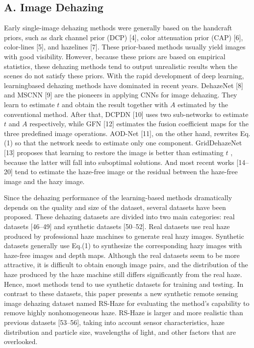 \documentclass{article}
\begin{document}
\subsection{A. Image Dehazing}


Early single-image dehazing methods were generally based on the handcraft priors, such as dark channel prior (DCP) [4], color attenuation prior (CAP) [6], color-lines [5], and hazelines [7]. These prior-based methods usually yield images with good visibility. However, because these priors are based on empirical statistics, these dehazing methods tend to output unrealistic results when the scenes do not satisfy these priors. With the rapid development of deep learning, learningbased dehazing methods have dominated in recent years. DehazeNet [8] and MSCNN [9] are the pioneers in applying CNNs for image dehazing. They learn to estimate $t$ and obtain the result together with $A$ estimated by the conventional method. After that, DCPDN [10] uses two sub-networks to estimate $t$ and $A$ respectively, while GFN [12] estimates the fusion coefficient maps for the three predefined image operations. AOD-Net [11], on the other hand, rewrites Eq.(1) so that the network needs to estimate only one component. GridDehazeNet [13] proposes that learning to restore the image is better than estimating $t$ , because the latter will fall into suboptimal solutions. And most recent works [14–20] tend to estimate the haze-free image or the residual between the haze-free image and the hazy image.


Since the dehazing performance of the learning-based methods dramatically depends on the quality and size of the dataset, several datasets have been proposed. These dehazing datasets are divided into two main categories: real datasets [46–49] and synthetic datasets [50–52]. Real datasets use real haze produced by professional haze machines to generate real hazy images. Synthetic datasets generally use Eq.(1) to synthesize the corresponding hazy images with haze-free images and depth maps. Although the real datasets seem to be more attractive, it is difficult to obtain enough image pairs, and the distribution of the haze produced by the haze machine still differs significantly from the real haze. Hence, most methods tend to use synthetic datasets for training and testing. In contrast to these datasets, this paper presents a new synthetic remote sensing image dehazing dataset named RS-Haze for evaluating the method’s capability to remove highly nonhomogeneous haze. RS-Haze is larger and more realistic than previous datasets [53–56], taking into account sensor characteristics, haze distribution and particle size, wavelengths of light, and other factors that are overlooked.
\end{document}
